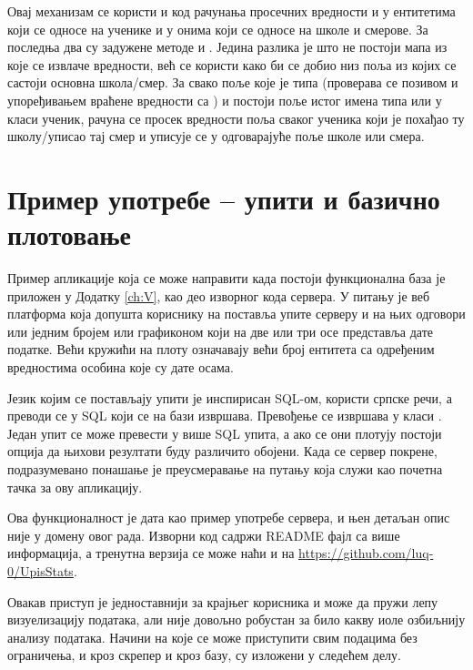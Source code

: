 Овај механизам се користи и код рачунања просечних вредности и у ентитетима који се односе на ученике и у онима који се односе на школе и смерове. За последња два су задужене методе  и . Једина разлика је што не постоји мапа из које се извлаче вредности, већ се користи  како би се добио низ поља из којих се састоји основна школа/смер. За свако поље које је типа  (проверава се позивом  и упоређивањем враћене вредности са ) и постоји поље истог имена типа  или  у класи ученик, рачуна се просек вредности поља сваког ученика који је похађао ту школу/уписао тај смер и уписује се у одговарајуће поље школе или смера.



\section{Пример употребе -- упити и базично плотовање}

Пример апликације која се може направити када постоји функционална база је приложен у Додатку \ref{ch:V}, као део изворног кода сервера. У питању је веб платформа која допушта кориснику на поставља упите серверу и на њих одговори или једним бројем или графиконом који на две или три осе представља дате податке. Већи кружићи на плоту означавају већи број ентитета са одређеним вредностима особина које су дате осама. 

Језик којим се постављају упити је инспирисан SQL-ом, користи српске речи, а преводи се у SQL који се на бази извршава. Превођење се извршава у класи . Један упит се може превести у више SQL упита, а ако се они плотују постоји опција да њихови резултати буду различито обојени. Када се сервер покрене, подразумевано понашање је преусмеравање на путању  која служи као почетна тачка за ову апликацију. 

Ова функционалност је дата као пример употребе сервера, и њен детаљан опис није у домену овог рада. Изворни код садржи README фајл са више информација, а тренутна верзија се може наћи и на \url{https://github.com/luq-0/UpisStats}. 

Овакав приступ је једноставнији за крајњег корисника и може да пружи лепу визуелизацију података, али није довољно робустан за било какву иоле озбиљнију анализу података. Начини на које се може приступити свим подацима без ограничења, и кроз скрепер и кроз базу, су изложени у следећем делу.
